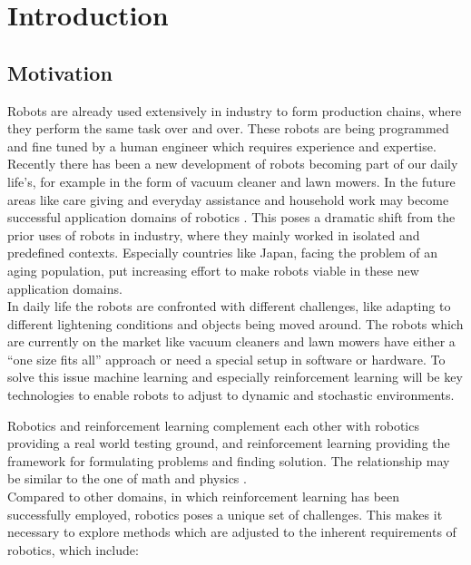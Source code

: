 
\chapter{Introduction}

\section{Motivation}
Robots are already used extensively in industry to form production chains,
where they perform the same task over and over.
These robots are being programmed and fine tuned
by a human engineer which requires experience and expertise. \\
Recently there has been a new development of robots
becoming part of our daily life's, for example in the form of 
vacuum cleaner and lawn mowers. In the future areas like care giving and
everyday assistance and household work may become successful
application domains
of robotics \citep{schaal2007new}.
This poses a dramatic shift from the prior uses of robots in industry, where
they mainly worked in isolated and predefined contexts.
Especially countries like Japan, facing the problem of an
aging population, put increasing effort to make robots
viable in these new application domains.  \\
In daily life the robots are confronted with different challenges,
like adapting to different lightening conditions and
objects being moved around.
The robots which are currently on the market
like vacuum cleaners and lawn mowers have
either a ``one size fits all'' approach or need a special setup
in software or hardware. To solve this issue
machine learning and especially
reinforcement learning will be key technologies to enable robots
to adjust to dynamic and stochastic environments.

Robotics and reinforcement learning complement each other
with robotics providing a real world testing ground, and reinforcement learning providing
the framework for formulating problems and finding solution. The 
relationship may be similar to the one of  math and physics
\citep{kober2013reinforcement}. \\
Compared to other domains, in which reinforcement learning has been
successfully employed,
robotics poses a unique set of challenges. This makes
it necessary to explore methods which are adjusted to the inherent
requirements of robotics, which include:

